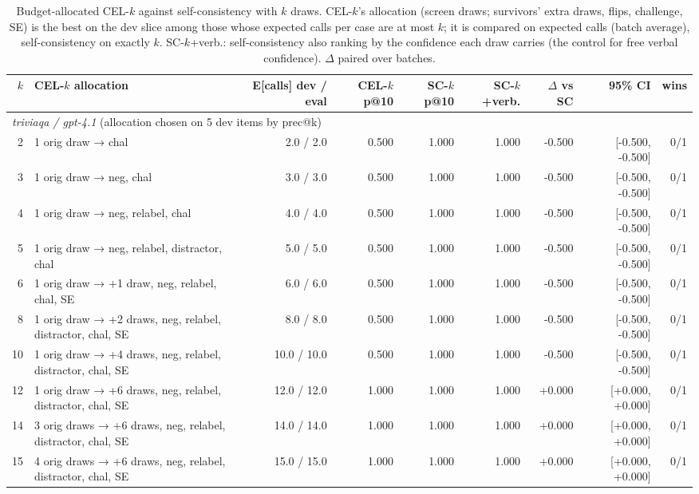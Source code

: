\begin{table}[t]
\centering
\small
\begin{tabular}{rlrrrrrrr}
\toprule
$k$ & CEL-$k$ allocation & E[calls] dev / eval & CEL-$k$ p@10 & SC-$k$ p@10 & SC-$k$+verb. & $\Delta$ vs SC & 95\% CI & wins \\
\midrule
\multicolumn{9}{l}{\emph{triviaqa / gpt-4.1} (allocation chosen on 5 dev items by prec@k)} \\
2 & 1 orig draw → chal & 2.0 / 2.0 & 0.500 & 1.000 & 1.000 & -0.500 & [-0.500, -0.500] & 0/1 \\
3 & 1 orig draw → neg, chal & 3.0 / 3.0 & 0.500 & 1.000 & 1.000 & -0.500 & [-0.500, -0.500] & 0/1 \\
4 & 1 orig draw → neg, relabel, chal & 4.0 / 4.0 & 0.500 & 1.000 & 1.000 & -0.500 & [-0.500, -0.500] & 0/1 \\
5 & 1 orig draw → neg, relabel, distractor, chal & 5.0 / 5.0 & 0.500 & 1.000 & 1.000 & -0.500 & [-0.500, -0.500] & 0/1 \\
6 & 1 orig draw → +1 draw, neg, relabel, chal, SE & 6.0 / 6.0 & 0.500 & 1.000 & 1.000 & -0.500 & [-0.500, -0.500] & 0/1 \\
8 & 1 orig draw → +2 draws, neg, relabel, distractor, chal, SE & 8.0 / 8.0 & 0.500 & 1.000 & 1.000 & -0.500 & [-0.500, -0.500] & 0/1 \\
10 & 1 orig draw → +4 draws, neg, relabel, distractor, chal, SE & 10.0 / 10.0 & 0.500 & 1.000 & 1.000 & -0.500 & [-0.500, -0.500] & 0/1 \\
12 & 1 orig draw → +6 draws, neg, relabel, distractor, chal, SE & 12.0 / 12.0 & 1.000 & 1.000 & 1.000 & +0.000 & [+0.000, +0.000] & 0/1 \\
14 & 3 orig draws → +6 draws, neg, relabel, distractor, chal, SE & 14.0 / 14.0 & 1.000 & 1.000 & 1.000 & +0.000 & [+0.000, +0.000] & 0/1 \\
15 & 4 orig draws → +6 draws, neg, relabel, distractor, chal, SE & 15.0 / 15.0 & 1.000 & 1.000 & 1.000 & +0.000 & [+0.000, +0.000] & 0/1 \\
\bottomrule
\end{tabular}
\caption{Budget-allocated CEL-$k$ against self-consistency with $k$ draws. CEL-$k$'s allocation (screen draws; survivors' extra draws, flips, challenge, SE) is the best on the dev slice among those whose expected calls per case are at most $k$; it is compared on expected calls (batch average), self-consistency on exactly $k$. SC-$k$+verb.: self-consistency also ranking by the confidence each draw carries (the control for free verbal confidence). $\Delta$ paired over batches.}
\label{tab:budget_matched}
\end{table}
